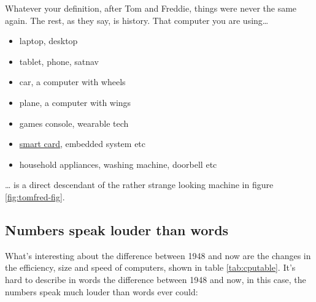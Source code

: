 \documentclass[
  12pt,
]{book}
\providecommand{\tightlist}{%
  \setlength{\itemsep}{0pt}\setlength{\parskip}{0pt}}
\begin{document}
Whatever your definition, after Tom and Freddie, things were never the same again. The rest, as they say, is history. That computer you are using\ldots{}

\begin{itemize}
\tightlist
\item
  laptop, desktop
\item
  tablet, phone, satnav
\item
  car, a computer with wheels
\item
  plane, a computer with wings
\item
  games console, wearable tech
\item
  \href{https://en.wikipedia.org/wiki/Smart_card}{smart card}, embedded system etc
\item
  household appliances, washing machine, doorbell etc
\end{itemize}

\ldots{} is a direct descendant of the rather strange looking machine in figure \ref{fig:tomfred-fig}.

\hypertarget{louder}{%
\subsection{Numbers speak louder than words}\label{louder}}

What's interesting about the difference between 1948 and now are the changes in the efficiency, size and speed of computers, shown in table \ref{tab:cputable}. It's hard to describe in words the difference between 1948 and now, in this case, the numbers speak much louder than words ever could:
\end{document}

